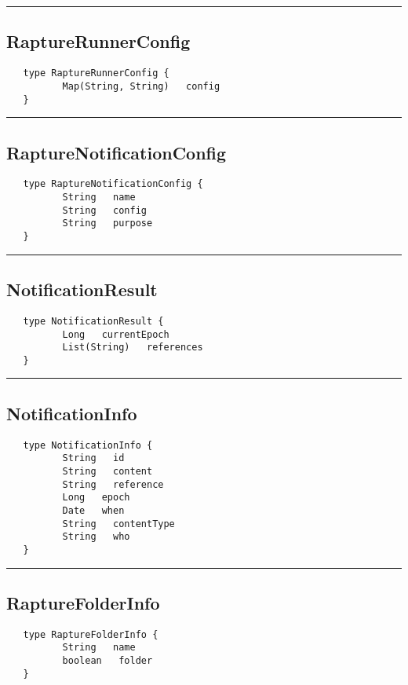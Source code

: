 \rule{15cm}{2pt}
\subsection{RaptureRunnerConfig}
\label{type:RaptureRunnerConfig}

\begin{verbatim}
   type RaptureRunnerConfig {
          Map(String, String)   config
   }
\end{verbatim}

\rule{15cm}{2pt}
\subsection{RaptureNotificationConfig}
\label{type:RaptureNotificationConfig}

\begin{verbatim}
   type RaptureNotificationConfig {
          String   name
          String   config
          String   purpose
   }
\end{verbatim}

\rule{15cm}{2pt}
\subsection{NotificationResult}
\label{type:NotificationResult}

\begin{verbatim}
   type NotificationResult {
          Long   currentEpoch
          List(String)   references
   }
\end{verbatim}

\rule{15cm}{2pt}
\subsection{NotificationInfo}
\label{type:NotificationInfo}

\begin{verbatim}
   type NotificationInfo {
          String   id
          String   content
          String   reference
          Long   epoch
          Date   when
          String   contentType
          String   who
   }
\end{verbatim}

\rule{15cm}{2pt}
\subsection{RaptureFolderInfo}
\label{type:RaptureFolderInfo}

\begin{verbatim}
   type RaptureFolderInfo {
          String   name
          boolean   folder
   }
\end{verbatim}


